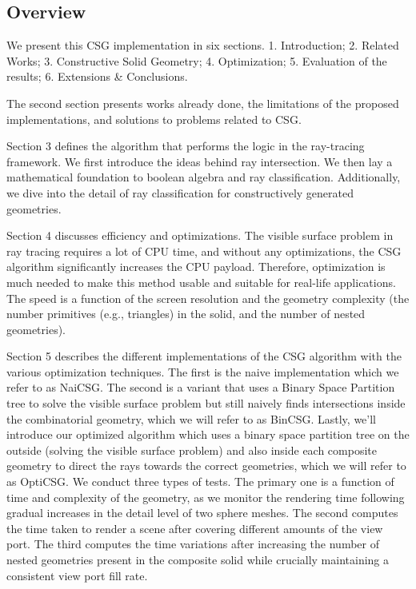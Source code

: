 \documentclass[a4paper,11pt,oneside]{article}
\begin{document}
\subsection{Overview}
  
We present this CSG implementation in six sections. 1. Introduction;  2. Related Works; 3. Constructive Solid Geometry; 4. Optimization; 5. Evaluation of the results; 6. Extensions \& Conclusions.
  
The second section presents works already done, the limitations of the proposed implementations, and solutions to problems related to CSG.
  
Section 3 defines the algorithm that performs the logic in the ray-tracing framework. We first introduce the ideas behind ray intersection. We then lay a mathematical foundation to boolean algebra and ray classification. Additionally, we dive into the detail of ray classification for constructively generated geometries. 
  
Section 4 discusses efficiency and optimizations. The visible surface problem in ray tracing requires a lot of CPU time, and without any optimizations, the CSG algorithm significantly increases the CPU payload. Therefore, optimization is much needed to make this method usable and suitable for real-life applications. The speed is a function of the screen resolution and the geometry complexity (the number primitives (e.g., triangles) in the solid, and the number of nested geometries).
  
Section 5 describes the different implementations of the CSG algorithm with the various optimization techniques. The first is the naive implementation which we refer to as NaiCSG. The second is a variant that uses a Binary Space Partition tree to solve the visible surface problem but still naively finds intersections inside the combinatorial geometry, which we will refer to as BinCSG. Lastly, we'll introduce our optimized algorithm which uses a binary space partition tree on the outside (solving the visible surface problem) and also inside each composite geometry to direct the rays towards the correct geometries, which we will refer to as OptiCSG. We conduct three types of tests. The primary one is a function of time and complexity of the geometry, as we monitor the rendering time following gradual increases in the detail level of two sphere meshes. The second computes the time taken to render a scene after covering different amounts of the view port. The third computes the time variations after increasing the number of nested geometries present in the composite solid while crucially maintaining a consistent view port fill rate.
  
\end{document}
